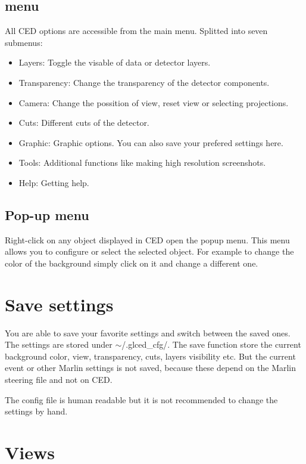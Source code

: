\documentclass[a4paper,10pt]{article}
\begin{document}
\subsection{menu}
All CED options are accessible from the main menu.
Splitted into seven submenus: 
\begin{itemize}
    \item{Layers}: Toggle the visable of data or detector layers. 
    \item{Transparency}: Change the transparency of the detector components. 
    \item{Camera}: Change the possition of view, reset view or selecting projections. 

    \item{Cuts}: Different cuts of the detector. 

    \item{Graphic}: Graphic options. You can also save your prefered settings here.

    \item{Tools}: Additional functions like making high resolution screenshots.

    \item{Help}: Getting help.

\end{itemize}

\subsection{Pop-up menu}
Right-click on any object displayed in CED open the popup menu. 
This menu allows you to configure or select the selected object.
For example to change the color of the background simply click on it and change a different one.

\section{Save settings}
You are able to save your favorite settings and switch between the saved ones. 
The settings are stored under $\sim$/.glced\_cfg/.
The save function store the current background color, view, transparency, cuts, layers visibility etc. 
But the current event or other Marlin settings is not saved, because these depend on the Marlin steering file and not on CED. 

The config file  is human readable but it is not recommended to change the settings by hand. 

\section{Views}
\end{document}
